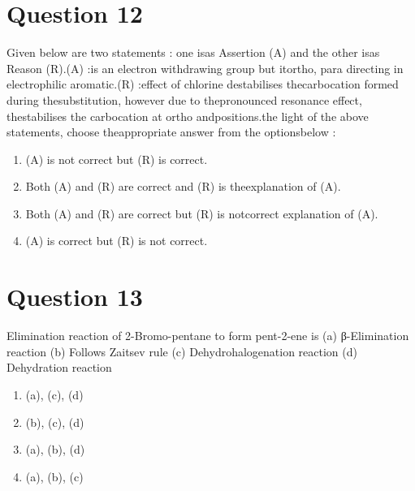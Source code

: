 \documentclass{article}
\begin{document}
\section*{Question 12}
Given below are two statements : one is\newlinelabelled as Assertion (A) and the other is\newlinelabelled as Reason (R).\newlineAssertion (A) :\newlineChlorine is an electron withdrawing group but it\newlineis ortho, para directing in electrophilic aromatic\newlinesubstitution.\newlineReason (R) :\newlineInductive effect of chlorine destabilises the\newlineintermediate carbocation formed during the\newlineelectrophilic substitution, however due to the\newlinemore pronounced resonance effect, the\newlinehalogen stabilises the carbocation at ortho and\newlinepara positions.\newlineIn the light of the above statements, choose the\newlinemost appropriate answer from the options\newlinegiven below :\newline  
\begin{enumerate}[label=(\alph*)]
\item  (A) is not correct but (R) is correct.
\item  Both (A) and (R) are correct and (R) is the\newlinecorrect explanation of (A).
\item  Both (A) and (R) are correct but (R) is not\newlinethe correct explanation of (A).
\item  (A) is correct but (R) is not correct.
\end{enumerate}
\newpage
\section*{Question 13}
Elimination reaction of 2-Bromo-pentane to form pent-2-ene is \newline (a) β-Elimination reaction \newline (b) Follows Zaitsev rule \newline (c) Dehydrohalogenation reaction \newline (d) Dehydration reaction  
\begin{enumerate}[label=(\alph*)]
\item (a), (c), (d)
\item (b), (c), (d)
\item  (a), (b), (d)
\item (a), (b), (c)
\end{enumerate}
\newpage
\end{document}

